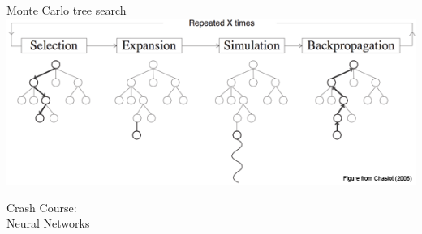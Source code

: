 \documentclass{beamer}
\begin{document}
  \begin{frame}{Monte Carlo tree search}
    \includegraphics[width=\textwidth]{../img/MCTS.png}
  \end{frame}

  \begin{frame}[standout]
    \begin{center}
      Crash Course:\\
      Neural Networks
    \end{center}
  \end{frame}
\end{document}
